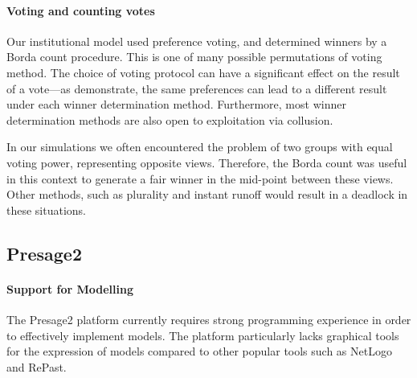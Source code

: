 \paragraph{Voting and counting votes} Our institutional model used preference
voting, and determined winners by a Borda count procedure. This is one of many
possible permutations of voting method. The choice of voting protocol can have
a significant effect on the result of a vote---as \citet{Pitt2011b}
demonstrate, the same preferences can lead to a different result under each
winner determination method. Furthermore, most winner determination methods
are also open to exploitation via collusion.

In our simulations we often encountered the problem of two groups with equal
voting power, representing opposite views. Therefore, the Borda count was
useful in this context to generate a fair winner in the mid-point between
these views. Other methods, such as plurality and instant runoff would result
in a deadlock in these situations.


\subsection{Presage2}

\paragraph{Support for Modelling} The Presage2 platform currently requires
strong programming experience in order to effectively implement models. The
platform particularly lacks graphical tools for the expression of models
compared to other popular tools such as NetLogo and RePast.

